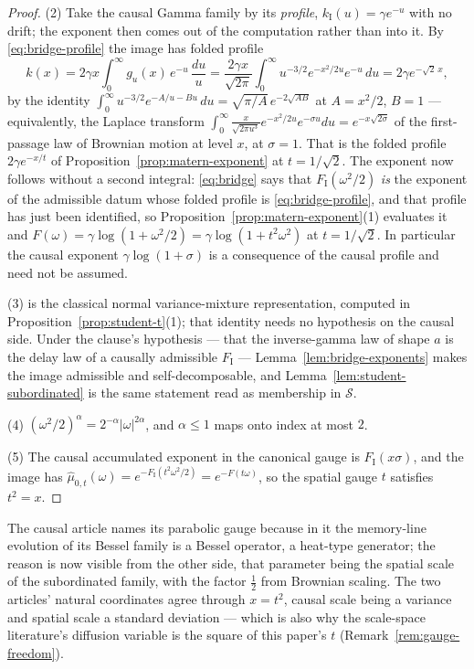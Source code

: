 \begin{proof}
(2) Take the causal Gamma family by its \emph{profile}, $k_{\mathrm I}(u) = \gamma e^{-u}$ with
no drift; the exponent then comes out of the computation rather than into it. By
\ref{eq:bridge-profile} the image has folded profile
\[
  k(x) = 2\gamma x\int_0^\infty g_u(x)\,e^{-u}\,\frac{du}{u}
       = \frac{2\gamma x}{\sqrt{2\pi}}\int_0^\infty u^{-3/2}e^{-x^2/2u}e^{-u}\,du
       = 2\gamma e^{-\sqrt2\,x},
\]
by the identity $\int_0^\infty u^{-3/2}e^{-A/u - Bu}\,du = \sqrt{\pi/A}\,e^{-2\sqrt{AB}}$ at
$A = x^2/2$, $B = 1$ --- equivalently, the Laplace transform
$\int_0^\infty \frac{x}{\sqrt{2\pi u^3}}e^{-x^2/2u}e^{-\sigma u}du = e^{-x\sqrt{2\sigma}}$ of the
first-passage law of Brownian motion at level $x$, at $\sigma = 1$. That is the folded profile
$2\gamma e^{-x/t}$ of Proposition~\ref{prop:matern-exponent} at $t = 1/\sqrt2$. The exponent now
follows without a second integral: \ref{eq:bridge} says that $F_{\mathrm I}(\omega^2/2)$
\emph{is} the exponent of the admissible datum whose folded profile is
\ref{eq:bridge-profile}, and that profile has just been identified, so
Proposition~\ref{prop:matern-exponent}(1) evaluates it and
$F(\omega) = \gamma\log(1 + \omega^2/2) = \gamma\log(1 + t^2\omega^2)$ at $t = 1/\sqrt2$. In
particular the causal exponent $\gamma\log(1+\sigma)$ is a consequence of the causal profile and
need not be assumed.

(3) is the classical normal variance-mixture representation, computed in
Proposition~\ref{prop:student-t}(1); that identity needs no hypothesis on the causal side. Under
the clause's hypothesis --- that the inverse-gamma law of shape $a$ is the delay law of a causally
admissible $F_{\mathrm I}$ --- Lemma~\ref{lem:bridge-exponents} makes the image admissible and
self-decomposable, and Lemma~\ref{lem:student-subordinated} is the same statement read as
membership in $\mathcal{S}$.

(4) $(\omega^2/2)^\alpha = 2^{-\alpha}|\omega|^{2\alpha}$, and $\alpha \le 1$ maps onto index
at most $2$.

(5) The causal accumulated exponent in the canonical gauge is $F_{\mathrm I}(x\sigma)$, and the
image has $\hat\mu_{0,t}(\omega) = e^{-F_{\mathrm I}(t^2\omega^2/2)} = e^{-F(t\omega)}$, so the
spatial gauge $t$ satisfies $t^2 = x$.
\end{proof}

The causal article names its parabolic gauge because in it
the memory-line evolution of its Bessel family is a Bessel operator, a heat-type generator; the
reason is now visible from the other side, that parameter being the spatial scale of the
subordinated family, with the factor $\tfrac12$ from Brownian scaling. The two articles'
natural coordinates agree through $x = t^2$, causal scale being a variance and spatial scale a
standard deviation --- which is also why the scale-space literature's diffusion variable is the
square of this paper's $t$ (Remark~\ref{rem:gauge-freedom}).

